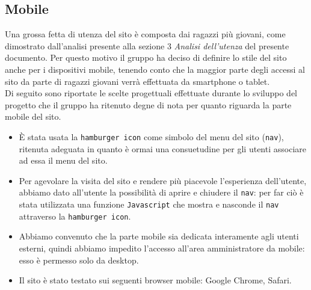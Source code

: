 \documentclass[../relazione.tex]{subfiles}
\begin{document}
	\subsection{Mobile}
	Una grossa fetta di utenza del sito è composta dai ragazzi più giovani, come dimostrato dall'analisi presente alla sezione 3 \textit{Analisi dell'utenza} del presente documento.
	Per questo motivo il gruppo ha deciso di definire lo stile del sito anche per i dispositivi mobile, tenendo conto che la maggior parte degli accessi al sito da parte di ragazzi giovani verrà effettuata da smartphone o tablet.\\
	Di seguito sono riportate le scelte progettuali effettuate durante lo sviluppo del progetto che il gruppo ha ritenuto degne di nota per quanto riguarda la parte mobile del sito.
	\begin{itemize}
		\item È stata usata la \texttt{hamburger icon} come simbolo del menu del sito (\texttt{nav}), ritenuta adeguata in quanto è ormai una consuetudine per gli utenti associare ad essa il menu del sito.
		\item Per agevolare la visita del sito e rendere più piacevole l'esperienza dell'utente, abbiamo dato all'utente la possibilità di aprire e chiudere il \texttt{nav}: per far ciò è stata utilizzata una funzione \texttt{Javascript} che mostra e nasconde il \texttt{nav} attraverso la \texttt{hamburger icon}.
		\item Abbiamo convenuto che la parte mobile sia dedicata interamente agli utenti esterni, quindi abbiamo impedito l'accesso all'area amministratore da mobile: esso è permesso solo da desktop.
		\item Il sito è stato testato sui seguenti browser mobile: Google Chrome, Safari.
	\end{itemize}
\end{document}

